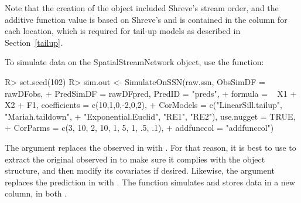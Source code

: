 \documentclass[nojss]{jss}
\renewenvironment{Schunk}{\vspace{\topsep}}{\vspace{\topsep}}
\begin{document}
Note that the creation of the  object
included Shreve's stream order, and the additive function value is
based on Shreve's and is contained in the  column for
each location, which is required for tail-up models as described in
Section~\ref{tailup}.

To simulate data on the SpatialStreamNetwork object, use the
 function:

\begin{Schunk}
\begin{Sinput}
R> set.seed(102)
R> sim.out <- SimulateOnSSN(raw.ssn, ObsSimDF = rawDFobs,
+     PredSimDF = rawDFpred, PredID = "preds",
+     formula = ~ X1 + X2 + F1, coefficients = c(10,1,0,-2,0,2),
+     CorModels = c("LinearSill.tailup", "Mariah.taildown",
+     "Exponential.Euclid", "RE1", "RE2"), use.nugget = TRUE,
+     CorParms = c(3, 10, 2, 10, 1, 5, 1, .5, .1),
+     addfunccol = "addfunccol")
\end{Sinput}
\end{Schunk}

The  argument replaces the observed 
 in  with .  For that
reason, it is best to use  to extract the
original observed   in
 to make sure it complies with the object structure, and
then modify its covariates if desired. Likewise, the 
argument replaces the prediction  
in  with . The function
 simulates and stores data in a new column,
 in both 
.
\end{document}
